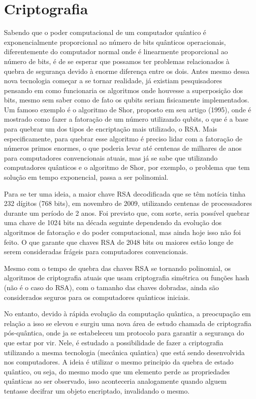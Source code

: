 \documentclass[
	12pt,				%
	oneside,			%
	a4paper,			%
	english,			%
	french,				%
	spanish,			%
	brazil,				%
	]{abntex2}
\begin{document}
\chapter{Criptografia}

Sabendo que o poder computacional de um computador quântico é exponencialmente proporcional ao número de bits quânticos operacionais, diferentemente do computador normal onde é linearmente proporcional ao número de bits, é de se esperar que possamos ter problemas relacionados à quebra de segurança devido à enorme diferença entre os dois. Antes mesmo dessa nova tecnologia começar a se tornar realidade, já existiam pesquisadores pensando em como funcionaria os algoritmos onde houvesse a superposição dos bits, mesmo sem saber como de fato os qubits seriam fisicamente implementados. Um famoso exemplo é o algoritmo de Shor, proposto em seu artigo (1995), onde é mostrado como fazer a fatoração de um número utilizando qubits, o que é a base para quebrar um dos tipos de encriptação mais utilizado, o RSA. Mais especificamente, para quebrar esse algoritmo é preciso lidar com a fatoração de números primos enormes, o que poderia levar até centenas de milhares de anos para computadores convencionais atuais, mas já se sabe que utilizando computadores quânticos e o algoritmo de Shor, por exemplo, o problema que tem solução em tempo exponencial, passa a ser polinomial.

Para se ter uma ideia, a maior chave RSA decodificada que se têm notícia tinha 232 dígitos (768 bits), em novembro de 2009, utilizando centenas de processadores durante um período de 2 anos. Foi previsto que, com sorte, seria possível quebrar uma chave de 1024 bits na década seguinte dependendo da evolução dos algoritmos de fatoração e do poder computacional, mas ainda hoje isso não foi feito. O que garante que chaves RSA de 2048 bits ou maiores estão longe de serem consideradas frágeis para computadores convencionais.

Mesmo com o tempo de quebra das chaves RSA se tornando polinomial, os algoritmos de criptografia atuais que usam criptografia simétrica ou funções hash (não é o caso do RSA), com o tamanho das chaves dobradas, ainda são considerados seguros para os computadores quânticos iniciais. 

No entanto, devido à rápida evolução da computação quântica, a preocupação em relação a isso se elevou e surgiu uma nova área de estudo chamada de criptografia pós-quântica, onde ja se estabeleceu um protocolo para garantir a segurança do que estar por vir. Nele, é estudado a possibilidade de fazer a criptografia utilizando a mesma tecnologia (mecânica quântica) que está sendo desenvolvida nos computadores. A ideia é utilizar o mesmo principio da quebra de estado quântico, ou seja, do mesmo modo que um elemento perde as propriedades quânticas ao ser observado, isso aconteceria analogamente quando alguem tentasse decifrar um objeto encriptado, invalidando o mesmo.
\end{document}
